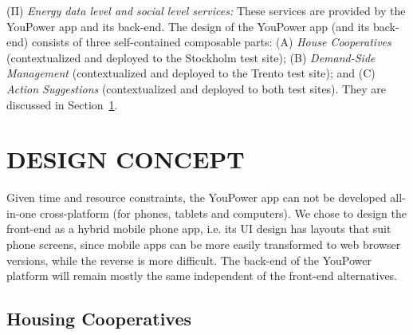 (II) \textit{Energy data level and social level services:} These services are provided by the YouPower app and its back-end. The design of the YouPower app (and its back-end) consists of three self-contained composable parts: (A) \textit{House Cooperatives} (contextualized and deployed to the Stockholm test site); (B) \textit{Demand-Side Management} (contextualized and deployed
to the Trento test site); and (C) \textit{Action Suggestions} (contextualized and deployed to both test sites). They are discussed in Section~\ref{sect:design_concept}.

\section{\uppercase{Design Concept}}
\label{sect:design_concept}

Given time and resource constraints, the YouPower app can not be developed all-in-one cross-platform (for phones, tablets and computers). We chose to design the front-end as a hybrid mobile phone app, i.e. its UI design has layouts that suit phone screens, %
since mobile apps can be more easily transformed to web browser versions, while the reverse is more difficult. The back-end of the YouPower platform will remain mostly the same independent of the front-end alternatives. 

\subsection{Housing Cooperatives}
\label{sect:brf}

